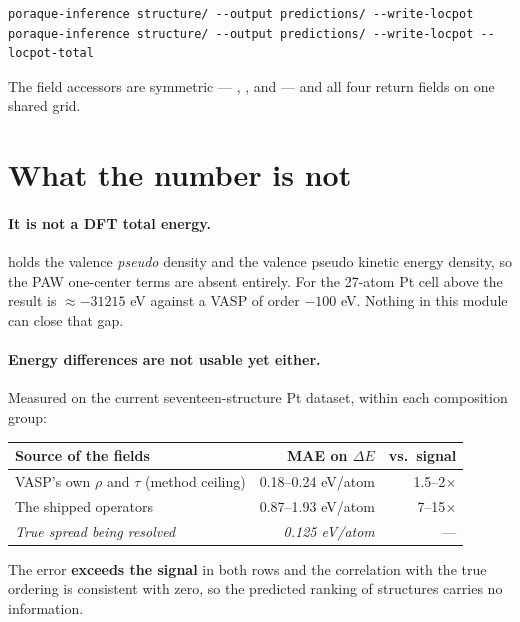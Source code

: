 \begin{lstlisting}
poraque-inference structure/ --output predictions/ --write-locpot
poraque-inference structure/ --output predictions/ --write-locpot --locpot-total
\end{lstlisting}

The field accessors are symmetric --- ,
,  and
 --- and all four return fields on one shared
grid.

\section{What the number is not}
\label{sec:not-a-dft-energy}

\paragraph{It is not a DFT total energy.}  holds the valence
\emph{pseudo} density and  the valence pseudo kinetic energy
density, so the PAW one-center terms are absent entirely. For the 27-atom Pt
cell above the result is $\approx -31215$ eV against a VASP  of
order $-100$ eV. Nothing in this module can close that gap.

\paragraph{Energy differences are not usable yet either.} Measured on the
current seventeen-structure Pt dataset, within each composition group:

\begin{center}
\begin{tabular}{@{}lrr@{}}
\toprule
Source of the fields & MAE on $\Delta E$ & vs.\ signal \\
\midrule
VASP's own $\rho$ and $\tau$ (method ceiling) & 0.18--0.24 eV/atom & 1.5--2$\times$ \\
The shipped operators & 0.87--1.93 eV/atom & 7--15$\times$ \\
\emph{True spread being resolved} & \emph{0.125 eV/atom} & --- \\
\bottomrule
\end{tabular}
\end{center}

The error \textbf{exceeds the signal} in both rows and the correlation with the
true ordering is consistent with zero, so the predicted ranking of structures
carries no information.


